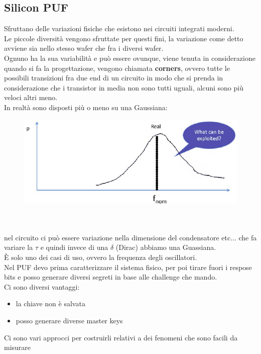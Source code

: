 \documentclass[oneside, 12pt]{extbook}
\begin{document}
\subsection{Silicon PUF}
Sfruttano delle variazioni fisiche che esistono nei circuiti integrati moderni.
\\Le piccole diversità vengono sfruttate per questi fini, la variazione come detto avviene sia nello stesso wafer che fra i diversi wafer.
\\Ognuno ha la sua variabilità e può essere ovunque, viene tenuta in considerazione quando si fa la progettazione, vengono chiamata \textbf{corners}, ovvero tutte le possibili transizioni fra due end di un circuito in modo che si prenda in considerazione che i transistor in media non sono tutti uguali, alcuni sono più veloci altri meno.
\\In realtà sono disposti più o meno su una Gaussiana:\\
\begin{figure}[!h]
	\includegraphics[scale=0.4]{immagini/hardware/proc_variation_distrib.png}
	\caption{}
\end{figure}
\\\\nel circuito ci può essere variazione nella dimensione del condensatore etc... che fa variare la $\tau$ e quindi invece di una $\delta$ (Dirac) abbiamo una Guassiana.
\\È solo uno dei casi di uso, ovvero la frequenza degli oscillatori.
\\Nel PUF devo prima caratterizzare il sistema fisico, per poi tirare fuori i respose bits e posso generare diversi segreti in base alle challenge che mando.
\\Ci sono diversi vantaggi:
\begin{itemize}
	\item la chiave non è salvata
	\item posso generare diverse master keys
\end{itemize}
Ci sono vari approcci per costruirli relativi a dei fenomeni che sono facili da misurare
\end{document}
